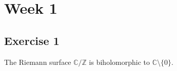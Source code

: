 \chapter*{Week 1}

\section*{Exercise 1}
The Riemann surface $\mathbb C/\mathbb Z$ is biholomorphic to $\mathbb C\setminus\{0\}$.